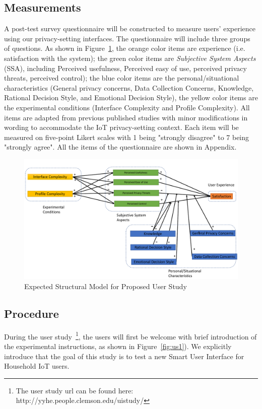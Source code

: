 \subsection{Measurements}\label{subsection:measures}
A post-test survey questionnaire will be constructed to measure users' experience using our privacy-setting interfaces. The questionnaire will include three groups of questions. As shown in Figure~\ref{fig:uimodel}, the orange color items are experience (i.e. satisfaction with the system); the green color items are \textit{Subjective System Aspects} (SSA), including Perceived usefulness, Perceived easy of use, perceived privacy threats, perceived control); the blue color items are the personal/situational characteristics (General privacy concerns, Data Collection Concerns, Knowledge, Rational Decision Style, and Emotional Decision Style), the yellow color items are the experimental conditions (Interface Complexity and Profile Complexity). All items are adapted from previous published studies with minor modifications in wording to accommodate the IoT privacy-setting context. Each item will be measured on five-point Likert scales with 1 being "strongly disagree" to 7 being "strongly agree". All the items of the questionnaire are shown in Appendix.
\begin{figure}
	\centering
	\includegraphics[width=\textwidth]{figures/uimodel.pdf}
	\caption{Expected Structural Model for Proposed User Study}
	\label{fig:uimodel}
\end{figure}

\subsection{Procedure}
During the user study~\footnote{The user study url can be found here: http://yyhe.people.clemson.edu/uistudy/}, the users will first be welcome with brief introduction of the experimental instructions, as shown in Figure~\ref{fig:us1}). We explicitly introduce that the goal of this study is to test a new Smart User Interface for Household IoT users.

